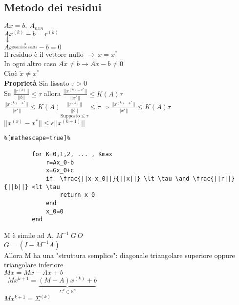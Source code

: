 \documentclass{article} %
\begin{document}
\begin{center}
    
    \newpage

    \section*{Metodo dei residui}

        \(Ax=b, \ A_{nxn}\)\\
        \(Ax^{(k)}-b =r^{(k)}\)\\
        \(\downarrow\)\\
        \(Ax^{\underset{\text{Soluzione esatta}}{*}}-b=0\)\\

    Il residuo è il vettore nullo \(\rightarrow \ x=x^* \) \\
    In ogni altro caso \(A\tilde{x} \neq b \rightarrow A\tilde{x} - b \neq 0\)\\
    Cioè \(\tilde{x} \neq x^*\)\\

    \textbf{Proprietà} Sia fissato \(\tau >0\)\\
    Se \(\frac{||r^{(k)}||}{||b||}\leq \tau\) allora \(\frac{||x^{(k)-x^*}||}{||x^*||}\leq K(A)\tau\)
    \(\frac{||x^{(k)-x^*}||}{||x^*||}\leq K(A) \underset{\text{Supposto}\le \tau}{\frac{||r^{(k)}||}{||b||}}\leq \tau \Rightarrow \frac{||x^{(k)-x^*}||}{||x^*||}\leq K(A)\tau\)
    \\
    \(||x^{(x)}-x^*|| \leq \epsilon ||x^{(k+1)}||\)

    \begin{lstlisting}%[mathescape=true]%

        for K=0,1,2, ... , Kmax
            r=Ax_0-b
            x=Gx_0+c
            if  \frac{||x-x_0||}{||x||} \lt \tau \and \frac{||r||}{||b||} <lt \tau 
                return x_0
            end
            x_0=0
        end
    \end{lstlisting}

        
    
    
    M è simile ad A, \(M^{-1} ~ G ~ O\)\\
    \(G=(I-M^{-1}A)\)\\
    Allora M ha una "struttura semplice": diagonale triangolare superiore oppure triangolare inferiore\\
    \(Mx=Mx-Ax+b\)\\
    \
    \(Mx^{k+1}=\underbrace{(M-A)x^{(k)}+b}_{\Sigma^{k} \in \mathbb{R}^n}\)\\
    \(Mx^{k+1}=\Sigma^{(k)}\)


\end{center}
\end{document}
